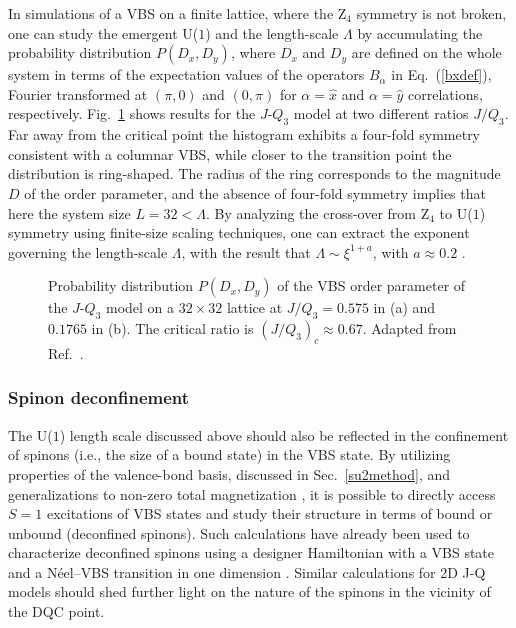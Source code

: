 \documentclass[range]{ar2e}
\begin{document}
In simulations of a VBS on a finite lattice, where the Z$_4$ symmetry is not broken, one can study the emergent U($1$) and the length-scale $\Lambda$ by 
accumulating the probability distribution $P(D_x,D_y)$, where $D_x$ and $D_y$ are defined on the whole system in terms of the expectation values of the 
operators $B_\alpha$ in Eq.~(\ref{bxdef}), Fourier transformed at $(\pi,0)$ and $(0,\pi)$ for $\alpha=\hat x$ and $\alpha=\hat y$ correlations, respectively.
Fig.~\ref{jq3histo} shows results for the $J$-$Q_3$ model at two different ratios $J/Q_3$. Far away from the critical point the histogram exhibits a four-fold
symmetry consistent with a columnar VBS, while closer to the transition point the distribution is ring-shaped. The radius of the ring corresponds
to the magnitude $D$ of the order parameter, and the absence of four-fold symmetry implies that here the system size $L=32 < \Lambda$. By analyzing the
cross-over from Z$_4$ to U($1$) symmetry using finite-size scaling techniques, one can extract the exponent governing the length-scale $\Lambda$, with 
the result that $\Lambda \sim \xi^{1+a}$, with $a \approx 0.2$ \cite{lou2009:sun}.


\begin{figure}
\centerline{}
  \caption{Probability distribution $P(D_x,D_y)$ of the VBS order parameter of the $J$-$Q_3$ model on a $32\times 32$
           lattice at $J/Q_3 = 0.575$ in (a) and $0.1765$ in (b). The critical ratio is $(J/Q_3)_c \approx 0.67$. Adapted
           from Ref.~\cite{lou2009:sun}.}  
\label{jq3histo}
\end{figure}

\subsubsection{Spinon deconfinement}

The U($1$) length scale discussed above should also be reflected in the confinement of spinons (i.e., the size of a bound state) in the VBS state. By utilizing 
properties of the valence-bond basis, discussed in Sec.~\ref{su2method}, and generalizations to non-zero total magnetization \cite{Banerjee10b,Wang10}, it is 
possible to directly access $S=1$ excitations of VBS states and study their structure in terms of bound or unbound (deconfined spinons). Such calculations have 
already been used to characterize deconfined spinons using a designer Hamiltonian with a VBS state and a N\'eel--VBS transition in one dimension \cite{Tang11a}. 
Similar calculations for 2D J-Q models should shed further light on the nature of the spinons in the vicinity of the DQC point.
\end{document}
